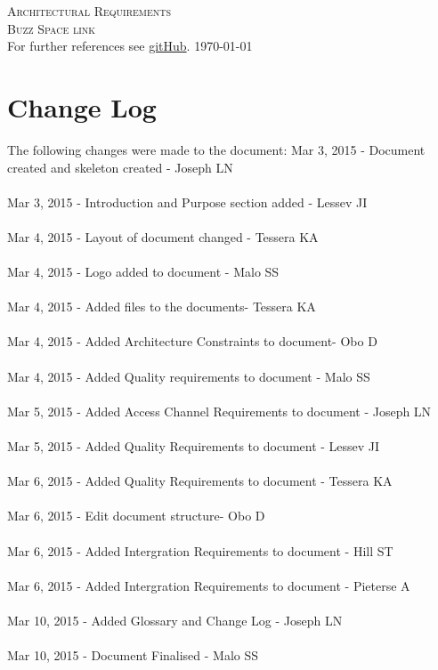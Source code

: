 \documentclass[a4paper,12pt]{report}
\begin{document}
\renewcommand{\thesection}{\arabic{section}}
\newpage
\begin{center}
\textsc{\LARGE Architectural Requirements}\\[1.5cm]
\textsc{\Large Buzz Space link}\\[0.5cm]
For further references see \href{https://github.com/COS301-Group-3-A-Phase2/Part2-Mini-Project.git}{gitHub}.
\today
\end{center}
\tableofcontents{}

\newpage

\section{Change Log}
The following changes were made to the document:\newline \newline
 Mar 3, 2015 -  Document created and skeleton created -  Joseph LN \\ \\  
 Mar 3, 2015 -  Introduction and Purpose section added - Lessev JI \\ \\
 Mar 4, 2015 -  Layout of document changed - Tessera KA \\ \\
 Mar 4, 2015 -  Logo added to document - Malo SS \\ \\
Mar 4, 2015 -  Added files to the documents- Tessera KA \\ \\
Mar 4, 2015 -  Added Architecture Constraints to document- Obo D \\ \\
 Mar 4, 2015 -  Added Quality requirements to document - Malo SS \\ \\
 Mar 5, 2015 -  Added Access Channel Requirements to document -  Joseph LN \\ \\ 
 Mar 5, 2015 -  Added Quality Requirements to document - Lessev JI \\ \\
Mar 6, 2015 -  Added Quality Requirements to document - Tessera KA \\ \\
 Mar 6, 2015 -  Edit document structure- Obo D \\ \\
 Mar 6, 2015 -  Added Intergration Requirements to document -  Hill ST \\ \\
 Mar 6, 2015 -  Added Intergration Requirements to document - Pieterse A \\ \\
 Mar 10, 2015 -  Added Glossary and Change Log -  Joseph LN \\ \\
 Mar 10, 2015 -  Document Finalised - Malo SS
\end{document}
